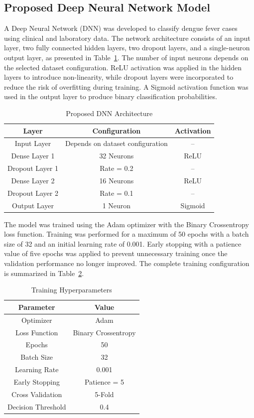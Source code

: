 \documentclass[conference]{IEEEtran}
\begin{document}
\subsection{Proposed Deep Neural Network Model}

A Deep Neural Network (DNN) was developed to classify dengue fever cases using clinical and laboratory data. The network architecture consists of an input layer, two fully connected hidden layers, two dropout layers, and a single-neuron output layer, as presented in Table~\ref{tab_model}. The number of input neurons depends on the selected dataset configuration. ReLU activation was applied in the hidden layers to introduce non-linearity, while dropout layers were incorporated to reduce the risk of overfitting during training. A Sigmoid activation function was used in the output layer to produce binary classification probabilities.

\begin{table}[H]
\caption{Proposed DNN Architecture}
\centering
\begin{tabular}{|c|c|c|}
\hline
\textbf{Layer} & \textbf{Configuration} & \textbf{Activation} \\
\hline
Input Layer & Depends on dataset configuration & -- \\
\hline
Dense Layer 1 & 32 Neurons & ReLU \\
\hline
Dropout Layer 1 & Rate = 0.2 & -- \\
\hline
Dense Layer 2 & 16 Neurons & ReLU \\
\hline
Dropout Layer 2 & Rate = 0.1 & -- \\
\hline
Output Layer & 1 Neuron & Sigmoid \\
\hline
\end{tabular}
\label{tab_model}
\end{table}

The model was trained using the Adam optimizer with the Binary Crossentropy loss function. Training was performed for a maximum of 50 epochs with a batch size of 32 and an initial learning rate of 0.001. Early stopping with a patience value of five epochs was applied to prevent unnecessary training once the validation performance no longer improved. The complete training configuration is summarized in Table~\ref{tab_hyper}.

\begin{table}[H]
\caption{Training Hyperparameters}
\centering
\begin{tabular}{|c|c|}
\hline
\textbf{Parameter} & \textbf{Value} \\
\hline
Optimizer & Adam \\
\hline
Loss Function & Binary Crossentropy \\
\hline
Epochs & 50 \\
\hline
Batch Size & 32 \\
\hline
Learning Rate & 0.001 \\
\hline
Early Stopping & Patience = 5 \\
\hline
Cross Validation & 5-Fold \\
\hline
Decision Threshold & 0.4 \\
\hline
\end{tabular}
\label{tab_hyper}
\end{table}
\end{document}
